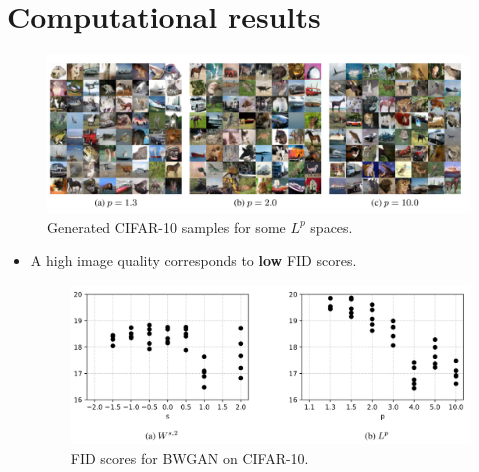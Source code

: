 \documentclass[landscape,headrule,footrule]{foils}
\begin{document}
\section{Computational results}
\tableofcontents
\begin{frame}
\begin{flushleft}
\begin{itemize}

\begin{figure}
\center
\includegraphics[scale=0.8]{figure/fig1.png}
\caption{Generated CIFAR-10 samples for some $L^p$ spaces.}
\end{figure}

\end{itemize}
\end{flushleft}
\end{frame}


\begin{frame}
\begin{flushleft}
\begin{itemize}
\item A high image quality corresponds to \textbf{low} FID scores. \\
\begin{figure}
\center
\includegraphics[scale=0.8]{figure/fig2.png}
\caption{FID scores for BWGAN on CIFAR-10.}
\end{figure}

\end{itemize}
\end{flushleft}
\end{frame}
\end{document}
